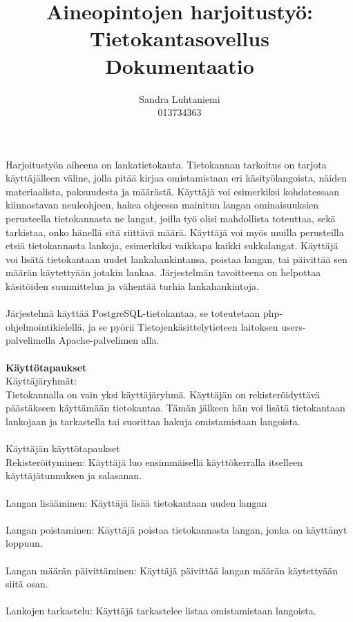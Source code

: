 \documentclass[12pt]{article}
\title{Aineopintojen harjoitustyö: Tietokantasovellus\\Dokumentaatio}
\author{Sandra Luhtaniemi\\013734363}
\begin{document}
\maketitle
Harjoitustyön aiheena on lankatietokanta. Tietokannan tarkoitus on tarjota käyttäjälleen väline, jolla pitää kirjaa omistamistaan eri käsityölangoista, näiden materiaalista, paksuudesta ja määrästä. Käyttäjä voi esimerkiksi kohdatessaan kiinnostavan neuleohjeen, hakea ohjeessa mainitun langan ominaisuuksien perusteella tietokannasta ne langat, joilla työ olisi mahdollista toteuttaa, sekä tarkistaa, onko hänellä sitä riittävä määrä. Käyttäjä voi myös muilla perusteilla etsiä tietokannasta lankoja, esimerkiksi vaikkapa kaikki sukkalangat. Käyttäjä voi lisätä tietokantaan uudet lankahankintansa, poistaa langan, tai päivittää sen määrän käytettyään jotakin lankaa. Järjestelmän tavoitteena on helpottaa käsitöiden suunnittelua ja vähentää turhia lankahankintoja.
\\ \ \\
Järjestelmä käyttää PostgreSQL-tietokantaa, se toteutetaan php-ohjelmointikielellä, ja se pyörii Tietojenkäsittelytieteen laitoksen users-palvelimella Apache-palvelimen alla. 
\\
\ \\
\textbf{Käyttötapaukset}\\ 
Käyttäjäryhmät:\\
Tietokannalla on vain yksi käyttäjäryhmä. Käyttäjän on rekisteröidyttävä päästäkseen käyttämään tietokantaa. Tämän jälkeen hän voi lisätä tietokantaan lankojaan ja tarkastella tai suorittaa hakuja omistamistaan langoista. 
\\ \ \\
Käyttäjän käyttötapaukset\\
Rekisteröityminen: Käyttäjä luo ensimmäisellä käyttökerralla itselleen käyttäjätunnuksen ja salasanan.
\\ \ \\
Langan lisääminen: Käyttäjä lisää tietokantaan uuden langan
\\ \ \\
Langan poistaminen: Käyttäjä poistaa tietokannasta langan, jonka on käyttänyt loppuun.
\\ \ \\
Langan määrän päivittäminen: Käyttäjä päivittää langan määrän käytettyään siitä osan.
\\ \ \\
Lankojen tarkastelu: Käyttäjä tarkastelee listaa omistamistaan langoista.
\\ \ \\
\end{document}
